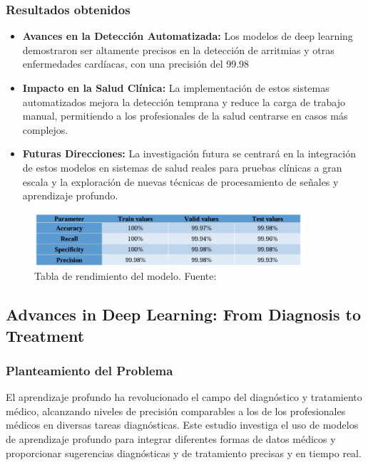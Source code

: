 \subsubsection{Resultados obtenidos}

\begin{itemize}
    \item \textbf{Avances en la Detección Automatizada:} Los modelos de deep learning demostraron ser altamente precisos en la detección de arritmias y otras enfermedades cardíacas, con una precisión del 99.98%
    \item \textbf{Impacto en la Salud Clínica:} La implementación de estos sistemas automatizados mejora la detección temprana y reduce la carga de trabajo manual, permitiendo a los profesionales de la salud centrarse en casos más complejos.
    \item \textbf{Futuras Direcciones:} La investigación futura se centrará en la integración de estos modelos en sistemas de salud reales para pruebas clínicas a gran escala y la exploración de nuevas técnicas de procesamiento de señales y aprendizaje profundo.
\end{itemize}

\begin{figure}[H]
    \centering
    \includegraphics[width=0.9\textwidth]{images_repo/PERFORMAC.jpg}
    \caption{Tabla de rendimiento del modelo. Fuente: \cite{arulkumar2023monitoring}}
    \label{Tabla de rendimiento del modelo}
\end{figure}


\subsection{Advances in Deep Learning: From Diagnosis to Treatment \citep{huang2023advances}}

\subsubsection{Planteamiento del Problema}

El aprendizaje profundo ha revolucionado el campo del diagnóstico y tratamiento médico, alcanzando niveles de precisión comparables a los de los profesionales médicos en diversas tareas diagnósticas. Este estudio investiga el uso de modelos de aprendizaje profundo para integrar diferentes formas de datos médicos y proporcionar sugerencias diagnósticas y de tratamiento precisas y en tiempo real.

